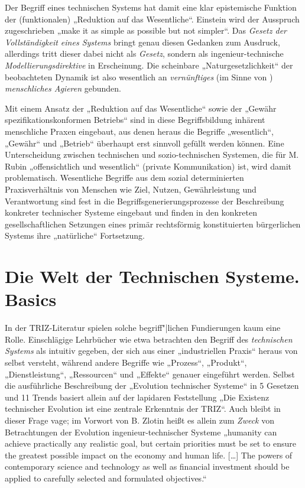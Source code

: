 \documentclass[11pt,a4paper]{article}
\begin{document}
Der Begriff eines technischen Systems hat damit eine klar epistemische
Funktion der (funktionalen) „Reduktion auf das Wesentliche“.  Einstein wird
der Ausspruch zugeschrieben „make it as simple as possible but not
simpler“. Das \emph{Gesetz der Vollständigkeit eines Systems} bringt genau
diesen Gedanken zum Ausdruck, allerdings tritt dieser dabei nicht als
\emph{Gesetz}, sondern als ingenieur-technische \emph{Modellierungsdirektive}
in Erscheinung.  Die scheinbare „Naturgesetzlichkeit“ der beobachteten Dynamik
ist also wesentlich an \emph{vernünftiges} (im Sinne von \cite{Vernadsky1997})
\emph{menschliches Agieren} gebunden.

Mit einem Ansatz der „Reduktion auf das Wesentliche“ sowie der „Gewähr
spezifikationskonformen Betriebs“ sind in diese Begriffsbildung inhärent
menschliche Praxen eingebaut, aus denen heraus die Begriffe „wesentlich“,
„Gewähr“ und „Betrieb“ überhaupt erst sinnvoll gefüllt werden können.  Eine
Unterscheidung zwischen technischen und sozio-technischen Systemen, die für
M. Rubin „offensichtlich und wesentlich“ (private Kommunikation) ist, wird
damit problematisch. Wesentliche Begriffe aus dem sozial determinierten
Praxisverhältnis von Menschen wie Ziel, Nutzen, Gewährleistung und
Verantwortung sind fest in die Begriffsgenerierungsprozesse der Beschreibung
konkreter technischer Systeme eingebaut und finden in den konkreten
gesellschaftlichen Setzungen eines primär rechtsförmig konstituierten
bürgerlichen Systems ihre „natürliche“ Fortsetzung.

\section{Die Welt der Technischen Systeme. Basics}

In der TRIZ-Literatur spielen solche begriff"|lichen Fundierungen kaum eine
Rolle.  Einschlägige Lehrbücher wie etwa \cite{KoltzeSouchkov2017} betrachten
den Begriff des \emph{technischen Systems} als intuitiv gegeben, der sich aus
einer „industriellen Praxis“ heraus \cite[S. 2]{KoltzeSouchkov2017} von selbst
versteht, während andere Begriffe wie „Prozess“, „Produkt“, „Dienstleistung“,
„Ressourcen“ und „Effekte“ \cite[S. 6--10]{KoltzeSouchkov2017} genauer
eingeführt werden. Selbst die ausführliche Beschreibung der „Evolution
technischer Systeme“ in 5 Gesetzen und 11 Trends
\cite[Kap. 4.8]{KoltzeSouchkov2017} basiert allein auf der lapidaren
Feststellung „Die Existenz technischer Evolution ist eine zentrale Erkenntnis
der TRIZ“.  Auch \cite{TESE2018} bleibt in dieser Frage vage; im Vorwort von
B. Zlotin heißt es allein zum \emph{Zweck} von Betrachtungen der Evolution
ingenieur-technischer Systeme „humanity can achieve practically any realistic
goal, but certain priorities must be set to ensure the greatest possible
impact on the economy and human life. [\ldots] The powers of contemporary
science and technology as well as financial investment should be applied to
carefully selected and formulated objectives.“
\end{document}
